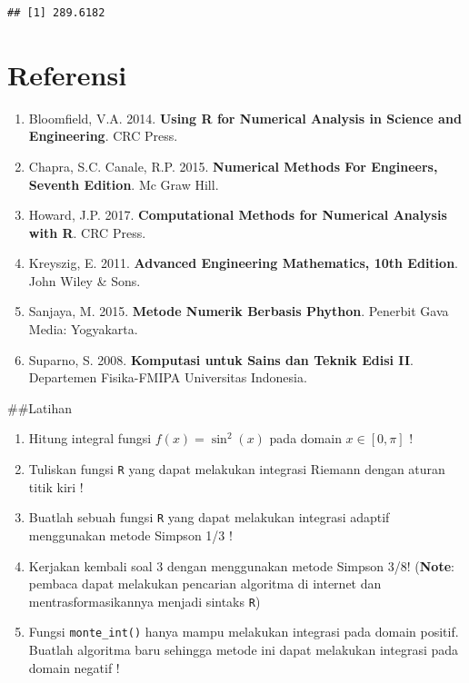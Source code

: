 \documentclass[]{book}
\providecommand{\tightlist}{%
  \setlength{\itemsep}{0pt}\setlength{\parskip}{0pt}}
\theoremstyle{definition}
\theoremstyle{definition}
\theoremstyle{definition}
\theoremstyle{remark}
\begin{document}
\begin{verbatim}
## [1] 289.6182
\end{verbatim}

\hypertarget{referensi-8}{%
\section{Referensi}\label{referensi-8}}

\begin{enumerate}
\def\labelenumi{\arabic{enumi}.}
\tightlist
\item
  Bloomfield, V.A. 2014. \textbf{Using R for Numerical Analysis in Science and Engineering}. CRC Press.
\item
  Chapra, S.C. Canale, R.P. 2015. \textbf{Numerical Methods For Engineers, Seventh Edition}. Mc Graw Hill.
\item
  Howard, J.P. 2017. \textbf{Computational Methods for Numerical Analysis with R}. CRC Press.
\item
  Kreyszig, E. 2011. \textbf{Advanced Engineering Mathematics, 10th Edition}. John Wiley \& Sons.
\item
  Sanjaya, M. 2015. \textbf{Metode Numerik Berbasis Phython}. Penerbit Gava Media: Yogyakarta.
\item
  Suparno, S. 2008. \textbf{Komputasi untuk Sains dan Teknik Edisi II}. Departemen Fisika-FMIPA Universitas Indonesia.
\end{enumerate}

\#\#Latihan

\begin{enumerate}
\def\labelenumi{\arabic{enumi}.}
\tightlist
\item
  Hitung integral fungsi \(f\left(x\right)=\sin^2\left(x\right)\) pada domain \(x \in \left[0,\pi\right]\) !
\item
  Tuliskan fungsi \texttt{R} yang dapat melakukan integrasi Riemann dengan aturan titik kiri !
\item
  Buatlah sebuah fungsi \texttt{R} yang dapat melakukan integrasi adaptif menggunakan metode Simpson 1/3 !
\item
  Kerjakan kembali soal 3 dengan menggunakan metode Simpson 3/8! (\textbf{Note}: pembaca dapat melakukan pencarian algoritma di internet dan mentrasformasikannya menjadi sintaks \texttt{R})
\item
  Fungsi \texttt{monte\_int()} hanya mampu melakukan integrasi pada domain positif. Buatlah algoritma baru sehingga metode ini dapat melakukan integrasi pada domain negatif !
\end{enumerate}


\end{document}
